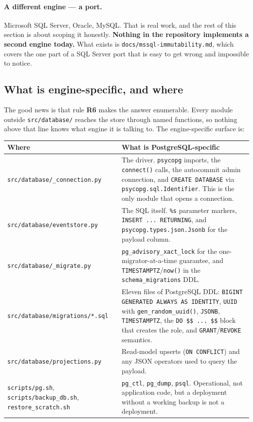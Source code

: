 \documentclass[11pt]{article}
\newcommand{\rulename}[1]{\textbf{#1}}
\begin{document}
\paragraph{A different engine --- a port.} Microsoft SQL Server, Oracle, MySQL. That is
real work, and the rest of this section is about scoping it honestly. \textbf{Nothing in
the repository implements a second engine today.} What exists is
\texttt{docs/mssql-immutability.md}, which covers the one part of a SQL Server port that is
easy to get wrong and impossible to notice.

\subsection{What is engine-specific, and where}

The good news is that rule \rulename{R6} makes the answer enumerable. Every module outside
\texttt{src/database/} reaches the store through named functions, so nothing above that
line knows what engine it is talking to. The engine-specific surface is:

\begin{longtable}{@{}p{}p{}@{}}
\toprule
\textbf{Where} & \textbf{What is PostgreSQL-specific} \\
\midrule
\endhead
\texttt{src/database/\_connection.py} & The driver. \texttt{psycopg} imports, the
  \texttt{connect()} calls, the autocommit admin connection, and
  \texttt{CREATE DATABASE} via \texttt{psycopg.sql.Identifier}. This is the only module
  that opens a connection. \\
\texttt{src/database/eventstore.py} & The SQL itself. \texttt{\%s} parameter markers,
  \texttt{INSERT ... RETURNING}, and \texttt{psycopg.types.json.Jsonb} for the payload
  column. \\
\texttt{src/database/\_migrate.py} & \texttt{pg\_advisory\_xact\_lock} for the
  one-migrator-at-a-time guarantee, and \texttt{TIMESTAMPTZ}/\texttt{now()} in the
  \texttt{schema\_migrations} DDL. \\
\texttt{src/database/}\newline\texttt{migrations/*.sql} & Eleven files of PostgreSQL DDL:
  \texttt{BIGINT GENERATED ALWAYS AS IDENTITY}, \texttt{UUID} with
  \texttt{gen\_random\_uuid()}, \texttt{JSONB}, \texttt{TIMESTAMPTZ}, the
  \texttt{DO \$\$ ... \$\$} block that creates the role, and \texttt{GRANT}/\texttt{REVOKE}
  semantics. \\
\texttt{src/database/projections.py} & Read-model upserts (\texttt{ON CONFLICT}) and any
  JSON operators used to query the payload. \\
\texttt{scripts/pg.sh}, \texttt{scripts/backup\_db.sh}, \texttt{restore\_scratch.sh} &
  \texttt{pg\_ctl}, \texttt{pg\_dump}, \texttt{psql}. Operational, not application code, but
  a deployment without a working backup is not a deployment. \\
\bottomrule
\end{longtable}
\end{document}
